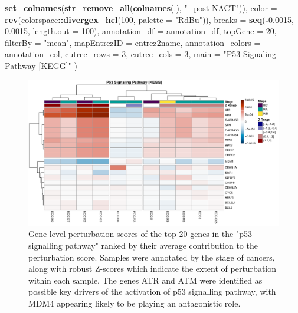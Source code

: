 \documentclass[9pt,a4paper,]{extarticle}
\newenvironment{Shaded}{\begin{snugshade}}{\end{snugshade}}
\newcommand{\AttributeTok}[1]{\textcolor[rgb]{0.13,0.29,0.53}{#1}}
\newcommand{\DecValTok}[1]{\textcolor[rgb]{0.00,0.00,0.81}{#1}}
\newcommand{\FloatTok}[1]{\textcolor[rgb]{0.00,0.00,0.81}{#1}}
\newcommand{\FunctionTok}[1]{\textcolor[rgb]{0.13,0.29,0.53}{\textbf{#1}}}
\newcommand{\NormalTok}[1]{#1}
\newcommand{\SpecialCharTok}[1]{\textcolor[rgb]{0.81,0.36,0.00}{\textbf{#1}}}
\newcommand{\StringTok}[1]{\textcolor[rgb]{0.31,0.60,0.02}{#1}}
\begin{document}
\begin{Shaded}
\begin{Highlighting}[]
        \FunctionTok{set\_colnames}\NormalTok{(}\FunctionTok{str\_remove\_all}\NormalTok{(}\FunctionTok{colnames}\NormalTok{(.), }\StringTok{"\_post{-}NACT"}\NormalTok{)),}
    \AttributeTok{color =} \FunctionTok{rev}\NormalTok{(colorspace}\SpecialCharTok{::}\FunctionTok{divergex\_hcl}\NormalTok{(}\DecValTok{100}\NormalTok{, }\AttributeTok{palette =} \StringTok{"RdBu"}\NormalTok{)),}
    \AttributeTok{breaks =} \FunctionTok{seq}\NormalTok{(}\SpecialCharTok{{-}}\FloatTok{0.0015}\NormalTok{, }\FloatTok{0.0015}\NormalTok{, }\AttributeTok{length.out =} \DecValTok{100}\NormalTok{), }
    \AttributeTok{annotation\_df =}\NormalTok{  annotation\_df, }
    \AttributeTok{topGene =} \DecValTok{20}\NormalTok{, }\AttributeTok{filterBy =} \StringTok{"mean"}\NormalTok{, }
    \AttributeTok{mapEntrezID =}\NormalTok{ entrez2name,}
    \AttributeTok{annotation\_colors =}\NormalTok{ annotation\_col,}
    \AttributeTok{cutree\_rows =} \DecValTok{3}\NormalTok{, }\AttributeTok{cutree\_cols =} \DecValTok{3}\NormalTok{,}
    \AttributeTok{main =} \StringTok{"P53 Signaling Pathway [KEGG]"}
\NormalTok{)}
\end{Highlighting}
\end{Shaded}

\begin{figure}

{\centering \includegraphics[width=1\linewidth]{sSNAPPY_paper_files/figure-latex/Figure7-1} 

}

\caption{Gene-level perturbation scores of the top 20 genes in the "p53 signalling pathway" ranked by their average contribution to the perturbation score. Samples were annotated by the stage of cancers, along with robust Z-scores which indicate the extent of perturbation within each sample. The genes ATR and ATM were identified as possible key drivers of the activation of p53 signalling pathway, with MDM4 appearing likely to be playing an antagonistic role.}\label{fig:Figure7}
\end{figure}
\end{document}

